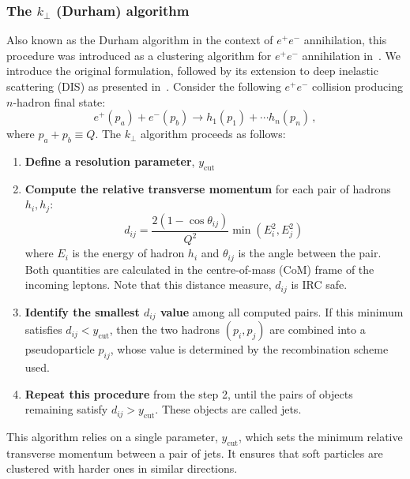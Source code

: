 \subsubsection{ The $k_\perp$ (Durham) algorithm}
Also known as the Durham algorithm in the context of $e^+e^-$ annihilation, this procedure was introduced as a clustering algorithm for $e^+e^-$ annihilation in~\cite{Catani:1991hj}. We introduce the original formulation, followed by its extension to deep inelastic scattering (DIS) as presented in~\cite{Catani:1992zp}.
Consider the following $e^+e^-$ collision producing $n$-hadron final state:
\begin{equation}
\label{eq:Durhamee}
e^+(p_a)+e^-(p_b)\rightarrow h_1(p_1) + \cdots h_n(p_n)\,,
\end{equation}
where $p_a+p_b\equiv Q$. The $k_\perp$ algorithm proceeds as follows: 
\begin{enumerate}
    \item {\textbf{Define a resolution parameter}}, $y_{\mathrm{cut}}$
    \item {\textbf{Compute the relative transverse momentum}} for each pair of hadrons $h_i, h_j$:
        \begin{equation}
        \label{eq:yij-De}
    	d_{ij}=\frac{2(1-\cos\theta_{ij})}{Q^2}\min(E_i^2,E_j^2)\,
    \end{equation}
    where $E_i$ is the energy of hadron $h_i$ and $\theta_{ij}$ is the angle between the pair. Both quantities are calculated in the centre-of-mass (CoM) frame of the incoming leptons. Note that this distance measure, $d_{ij}$ is IRC safe. 
    \item {\textbf{Identify the smallest $d_{ij}$ value}} among all computed pairs. If this minimum satisfies $d_{ij}<y_{\mathrm{cut}}$, then the two hadrons $(p_i,p_j)$ are combined into a pseudoparticle $p_{ij}$, whose value is determined by the recombination scheme used.
    \item {\textbf{Repeat this procedure}} from the step 2, until the pairs of objects remaining satisfy $d_{ij}>y_{\mathrm{cut}}$. These objects are called jets. 
\end{enumerate}
This algorithm relies on a single parameter, $y_{\mathrm{cut}}$, which sets the minimum relative transverse momentum between a pair of jets. It ensures that soft particles are clustered with harder ones in similar directions. 

